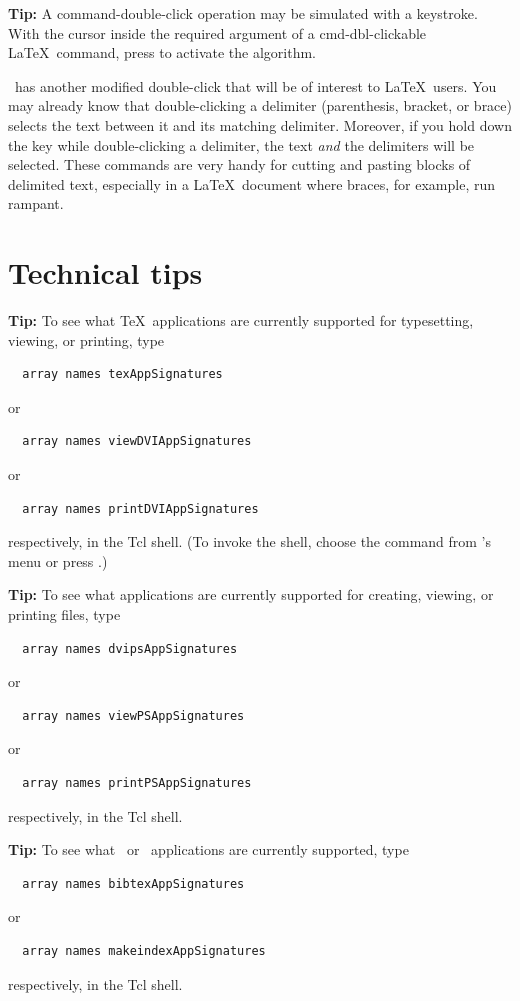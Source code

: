 \documentclass{report}
\begin{document}
\textbf{Tip:} A command-double-click operation may be simulated with a 
keystroke.  With the cursor inside the required argument of a 
cmd-dbl-clickable \LaTeX\ command, press  to activate the 
algorithm.

\Alpha\ has another modified double-click that will be of interest 
to \LaTeX\ users.  You may already know that double-clicking a 
delimiter (parenthesis, bracket, or brace) selects the text between 
it and its matching delimiter.  Moreover, if you hold down the 
 key while double-clicking a delimiter, the text \emph{and} 
the delimiters will be selected.  These commands are very handy for 
cutting and pasting blocks of delimited text, especially in a 
\LaTeX\ document where braces, for example, run rampant.

\chapter{Technical tips}

\textbf{Tip:} To see what \TeX\ applications are currently supported 
for typesetting, viewing, or printing, type
\begin{verbatim}
  array names texAppSignatures
\end{verbatim}
or
\begin{verbatim}
  array names viewDVIAppSignatures
\end{verbatim}
or
\begin{verbatim}
  array names printDVIAppSignatures
\end{verbatim}
respectively, in the Tcl shell.  (To invoke the shell, choose the 
 command from \Alpha's  menu or press 
.)

\textbf{Tip:} To see what applications are currently supported for 
creating, viewing, or printing  files, type
\begin{verbatim}
  array names dvipsAppSignatures
\end{verbatim}
or
\begin{verbatim}
  array names viewPSAppSignatures
\end{verbatim}
or
\begin{verbatim}
  array names printPSAppSignatures
\end{verbatim}
respectively, in the Tcl shell.

\textbf{Tip:} To see what \BibTeX\ or \MakeIndex\ applications are 
currently supported, type
\begin{verbatim}
  array names bibtexAppSignatures
\end{verbatim}
or
\begin{verbatim}
  array names makeindexAppSignatures
\end{verbatim}
respectively, in the Tcl shell.
\end{document}
